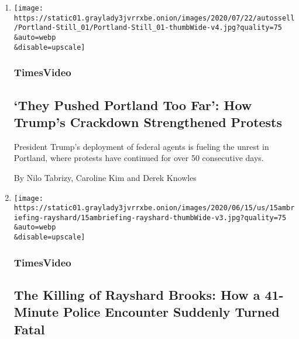\begin{enumerate}
\def\labelenumi{\arabic{enumi}.}
\item
  \href{/video/us/100000007250985/they-pushed-portland-too-far-trump-crackdown-strengthens-protests.html}{}

  \texttt{[image: https://static01.graylady3jvrrxbe.onion/images/2020/07/22/autossell/Portland-Still\_01/Portland-Still\_01-thumbWide-v4.jpg?quality=75\\\&auto=webp\\\&disable=upscale]}

  \hypertarget{timesvideo}{%
  \subsubsection{TimesVideo}\label{timesvideo}}

  \hypertarget{they-pushed-portland-too-far-how-trumps-crackdown-strengthened-protests}{%
  \subsection{`They Pushed Portland Too Far': How Trump's Crackdown
  Strengthened
  Protests}\label{they-pushed-portland-too-far-how-trumps-crackdown-strengthened-protests}}

  President Trump's deployment of federal agents is fueling the unrest
  in Portland, where protests have continued for over 50 consecutive
  days.

  By Nilo Tabrizy, Caroline Kim and Derek Knowles
\item
  \href{/video/us/100000007198581/rayshard-brooks-killing-garrett-rolfe.html}{}

  \texttt{[image: https://static01.graylady3jvrrxbe.onion/images/2020/06/15/us/15ambriefing-rayshard/15ambriefing-rayshard-thumbWide-v3.jpg?quality=75\\\&auto=webp\\\&disable=upscale]}

  \hypertarget{timesvideo-1}{%
  \subsubsection{TimesVideo}\label{timesvideo-1}}

  \hypertarget{the-killing-of-rayshard-brooks-how-a-41-minute-police-encounter-suddenly-turned-fatal}{%
  \subsection{The Killing of Rayshard Brooks: How a 41-Minute Police
  Encounter Suddenly Turned
  Fatal}\label{the-killing-of-rayshard-brooks-how-a-41-minute-police-encounter-suddenly-turned-fatal}}


\end{enumerate}
